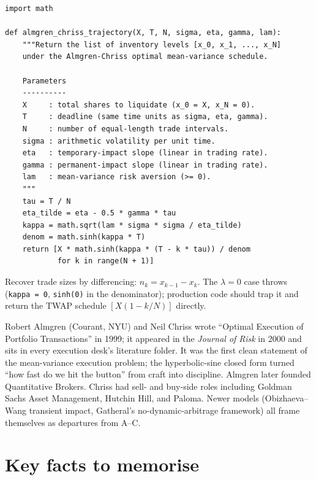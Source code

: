\begin{lstlisting}[caption={Almgren--Chriss optimal liquidation trajectory.}]
import math

def almgren_chriss_trajectory(X, T, N, sigma, eta, gamma, lam):
    """Return the list of inventory levels [x_0, x_1, ..., x_N]
    under the Almgren-Chriss optimal mean-variance schedule.

    Parameters
    ----------
    X     : total shares to liquidate (x_0 = X, x_N = 0).
    T     : deadline (same time units as sigma, eta, gamma).
    N     : number of equal-length trade intervals.
    sigma : arithmetic volatility per unit time.
    eta   : temporary-impact slope (linear in trading rate).
    gamma : permanent-impact slope (linear in trading rate).
    lam   : mean-variance risk aversion (>= 0).
    """
    tau = T / N
    eta_tilde = eta - 0.5 * gamma * tau
    kappa = math.sqrt(lam * sigma * sigma / eta_tilde)
    denom = math.sinh(kappa * T)
    return [X * math.sinh(kappa * (T - k * tau)) / denom
            for k in range(N + 1)]
\end{lstlisting}

Recover trade sizes by differencing: $n_k = x_{k-1} - x_k$. The
$\lambda = 0$ case throws (\texttt{kappa = 0}, \texttt{sinh(0)} in
the denominator); production code should trap it and return the
TWAP schedule $[X(1 - k/N)]$ directly.

\begin{historybox}
Robert Almgren (Courant, NYU) and Neil Chriss wrote ``Optimal
Execution of Portfolio Transactions'' in 1999; it appeared in the
\emph{Journal of Risk} in 2000 and sits in every execution desk's
literature folder. It was the first clean statement of the
mean-variance execution problem; the hyperbolic-sine closed form
turned ``how fast do we hit the button'' from craft into
discipline. Almgren later founded Quantitative Brokers. Chriss
had sell- and buy-side roles including Goldman Sachs Asset
Management, Hutchin Hill, and Paloma. Newer models
(Obizhaeva--Wang transient impact, Gatheral's no-dynamic-arbitrage
framework) all frame themselves as departures from A--C.
\end{historybox}

\section{Key facts to memorise}
\label{sec:ac_keyfacts}

